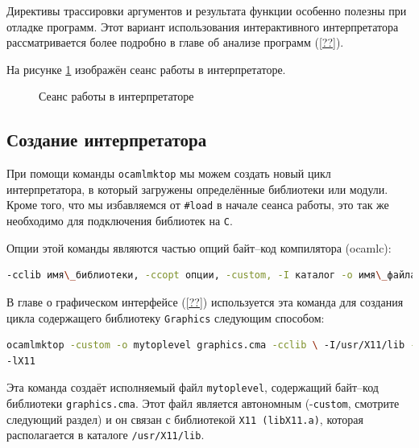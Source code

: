 Директивы трассировки аргументов и результата функции особенно полезны при
отладке программ. Этот вариант использования интерактивного интерпретатора
рассматривается более подробно в главе об анализе программ (\ref{??}).

На рисунке \ref{fig:session_with_the_toplevel_loop} изображён сеанс работы в
интерпретаторе.

\begin{figure}[h]
	\caption{\label{fig:session_with_the_toplevel_loop}Сеанс работы в
интерпретаторе}
\end{figure}

\subsection{Создание интерпретатора}

При помощи команды \texttt{ocamlmktop} мы можем создать новый цикл
интерпретатора, в который загружены определённые библиотеки или модули. Кроме
того, что мы избавляемся от \texttt{\#load} в начале сеанса работы, это так же
необходимо для подключения библиотек на \texttt{C}.

Опции этой команды являются частью опций байт--код компилятора (ocamlc):

\begin{lstlisting}[language=Bash]
-cclib имя\_библиотеки, -ccopt опции, -custom, -I каталог -o имя\_файла
\end{lstlisting}

В главе о графическом интерфейсе (\ref{??}) используется эта команда для
создания цикла содержащего библиотеку \texttt{Graphics} следующим способом:

\begin{lstlisting}[language=Bash]
ocamlmktop -custom -o mytoplevel graphics.cma -cclib \ -I/usr/X11/lib -cclib
-lX11
\end{lstlisting}

Эта команда создаёт исполняемый файл \texttt{mytoplevel}, содержащий байт--код
библиотеки \texttt{graphics.cma}. Этот файл является автономным
(-\texttt{custom}, смотрите следующий раздел) и он связан с библиотекой
\texttt{X11 (libX11.a)}, которая располагается в каталоге \texttt{/usr/X11/lib}.